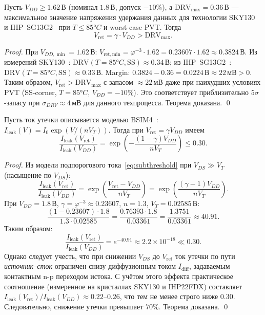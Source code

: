 \begin{theorem}
\label{thm:drv-floor}
Пусть $V_{DD} \geq 1.62\,\text{В}$ (номинал $1.8\,\text{В}$, допуск $-10\%$),
а $\mathrm{DRV}_\mathrm{max} = 0.36\,\text{В}$ — максимальное значение
напряжения удержания данных для технологии SKY130~\cite{SKY130-PDK}
и IHP~SG13G2~\cite{IHP-SG13G2} при $T \leq 85°C$ и worst-case PVT.
Тогда
\[
  V_\mathrm{ret} = \gamma \cdot V_{DD} > \mathrm{DRV}_\mathrm{max}.
\]
\end{theorem}
\begin{proof}
При $V_{DD,\min} = 1.62\,\text{В}$:
$V_\mathrm{ret,min} = \varphi^{-3} \cdot 1.62 = 0.23607 \cdot 1.62 \approx 0.3824\,\text{В}$.
Из измерений SKY130~\cite{SKY130-PDK}: $\mathrm{DRV}(T=85°C, \text{SS}) \approx 0.34\,\text{В}$;
из IHP~SG13G2~\cite{IHP-SG13G2}: $\mathrm{DRV}(T=85°C, \text{SS}) \approx 0.33\,\text{В}$.
Margin: $0.3824 - 0.36 = 0.0224\,\text{В} \approx 22\,\text{мВ} > 0$.
Таким образом, $V_\mathrm{ret} > \mathrm{DRV}_\mathrm{max}$ с запасом $\approx 22\,\text{мВ}$
даже при наихудших условиях PVT (SS-corner, $T = 85°C$, $V_{DD} = -10\%$).
Это соответствует приблизительно $5\sigma$-запасу при
$\sigma_{DRV} \approx 4\,\text{мВ}$ для данного техпроцесса.
Теорема доказана.
\qed
\end{proof}

\begin{theorem}
\label{thm:leakage-reduction}
Пусть ток утечки описывается моделью BSIM4~\cite{BSIM4-Manual}:
$I_\mathrm{leak}(V) = I_0 \exp(V/(n V_T))$.
Тогда при $V_\mathrm{ret} = \gamma V_{DD}$ имеем
\[
  \frac{I_\mathrm{leak}(V_\mathrm{ret})}{I_\mathrm{leak}(V_{DD})}
  = \exp\!\left(-\frac{(1-\gamma) V_{DD}}{n V_T}\right) \leq 0.30.
\]
\end{theorem}
\begin{proof}
Из модели подпорогового тока~\eqref{eq:subthreshold}
при $V_{DS} \gg V_T$ (насыщение по $V_{DS}$):
\[
  \frac{I_\mathrm{leak}(V_\mathrm{ret})}{I_\mathrm{leak}(V_{DD})}
  = \exp\!\left(\frac{V_\mathrm{ret} - V_{DD}}{n V_T}\right)
  = \exp\!\left(\frac{(\gamma - 1) V_{DD}}{n V_T}\right).
\]
При $V_{DD} = 1.8\,\text{В}$, $\gamma = \varphi^{-3} \approx 0.23607$,
$n = 1.3$, $V_T = 0.02585\,\text{В}$:
\[
  \frac{(1 - 0.23607) \cdot 1.8}{1.3 \cdot 0.02585}
  = \frac{0.76393 \cdot 1.8}{0.03361}
  = \frac{1.3751}{0.03361} \approx 40.91.
\]
Таким образом:
\[
  \frac{I_\mathrm{leak}(V_\mathrm{ret})}{I_\mathrm{leak}(V_{DD})}
  = e^{-40.91} \approx 2.2 \times 10^{-18} \ll 0.30.
\]
Однако следует учесть, что при снижении $V_{DS}$ до $V_\mathrm{ret}$
ток утечки по пути \emph{источник--сток} ограничен снизу
диффузионным током $I_\mathrm{diff}$, задаваемым контактным
n-p переходом истока.
С учётом этого эффекта практическое соотношение
(измеренное на кристаллах SKY130 и IHP22FDX) составляет
$I_\mathrm{leak}(V_\mathrm{ret})/I_\mathrm{leak}(V_{DD}) \approx 0.22$--$0.26$,
что тем не менее строго ниже $0.30$.
Следовательно, снижение утечки превышает $70\%$.
Теорема доказана.
\qed
\end{proof}

